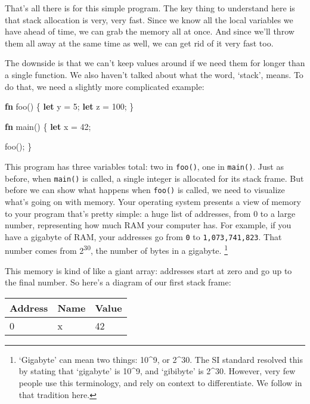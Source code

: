 \documentclass[a4paper,]{book}
\newenvironment{Shaded}{\begin{snugshade}}{\end{snugshade}}
\newcommand{\KeywordTok}[1]{\textcolor[rgb]{0.13,0.29,0.53}{\textbf{{#1}}}}
\newcommand{\DecValTok}[1]{\textcolor[rgb]{0.00,0.00,0.81}{{#1}}}
\newcommand{\NormalTok}[1]{{#1}}
\begin{document}
That's all there is for this simple program. The key thing to understand
here is that stack allocation is very, very fast. Since we know all the
local variables we have ahead of time, we can grab the memory all at
once. And since we'll throw them all away at the same time as well, we
can get rid of it very fast too.

The downside is that we can't keep values around if we need them for
longer than a single function. We also haven't talked about what the
word, `stack', means. To do that, we need a slightly more complicated
example:

\begin{Shaded}
\begin{Highlighting}[]
\KeywordTok{fn} \NormalTok{foo() \{}
    \KeywordTok{let} \NormalTok{y = }\DecValTok{5}\NormalTok{;}
    \KeywordTok{let} \NormalTok{z = }\DecValTok{100}\NormalTok{;}
\NormalTok{\}}

\KeywordTok{fn} \NormalTok{main() \{}
    \KeywordTok{let} \NormalTok{x = }\DecValTok{42}\NormalTok{;}

    \NormalTok{foo();}
\NormalTok{\}}
\end{Highlighting}
\end{Shaded}

This program has three variables total: two in \texttt{foo()}, one in
\texttt{main()}. Just as before, when \texttt{main()} is called, a
single integer is allocated for its stack frame. But before we can show
what happens when \texttt{foo()} is called, we need to visualize what's
going on with memory. Your operating system presents a view of memory to
your program that's pretty simple: a huge list of addresses, from 0 to a
large number, representing how much RAM your computer has. For example,
if you have a gigabyte of RAM, your addresses go from \texttt{0} to
\texttt{1,073,741,823}. That number comes from 2\textsuperscript{30},
the number of bytes in a gigabyte. \footnote{`Gigabyte' can mean two
  things: 10\^{}9, or 2\^{}30. The SI standard resolved this by stating
  that `gigabyte' is 10\^{}9, and `gibibyte' is 2\^{}30. However, very
  few people use this terminology, and rely on context to differentiate.
  We follow in that tradition here.}

This memory is kind of like a giant array: addresses start at zero and
go up to the final number. So here's a diagram of our first stack frame:

\begin{longtable}[]{@{}lll@{}}
\toprule
Address & Name & Value\tabularnewline
\midrule
\endhead
0 & x & 42\tabularnewline
\bottomrule
\end{longtable}
\end{document}
